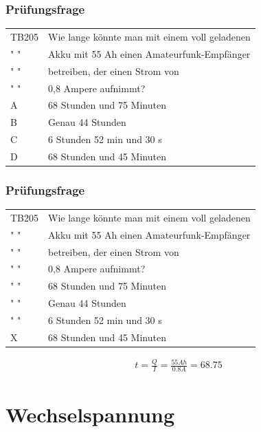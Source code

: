 \begin{frame}
    \frametitle{Prüfungsfrage}
    \begin{center}
    \begin{tabular}{l||l}\hline
        TB205 & Wie lange könnte man mit einem voll geladenen\\
        " " & Akku mit 55 Ah einen Amateurfunk-Empfänger\\ 
        " " & betreiben, der einen Strom von\\ 
        " " & 0,8 Ampere aufnimmt?\\ \hline\hline
         A & 68 Stunden und 75 Minuten \\ \hline
         B & Genau 44 Stunden \\ \hline
         C & 6 Stunden 52 min und 30 s \\\hline
         D & 68 Stunden und 45 Minuten \\\hline
    \end{tabular}
 	\end{center}
\end{frame}

\begin{frame}
    \frametitle{Prüfungsfrage}
    \begin{center}
    \begin{tabular}{l||l}\hline
        TB205 & Wie lange könnte man mit einem voll geladenen\\
        " " & Akku mit 55 Ah einen Amateurfunk-Empfänger\\ 
        " " & betreiben, der einen Strom von\\ 
        " " & 0,8 Ampere aufnimmt?\\ \hline\hline
         " " & 68 Stunden und 75 Minuten \\ \hline
         " " & Genau 44 Stunden \\ \hline
         " " & 6 Stunden 52 min und 30 s \\\hline
         X & 68 Stunden und 45 Minuten \\\hline
    \end{tabular}
        \begin{align} 
			t = \frac{Q}{I} = \frac{55Ah}{0.8A} = 68.75
		\end{align}
 	\end{center}
 	
\end{frame}

\section*{Wechselspannung}

